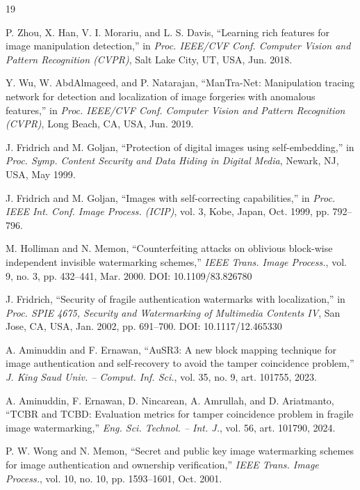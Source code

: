\documentclass[conference]{IEEEtran}
\begin{document}
\begin{thebibliography}{19}

 P. Zhou, X. Han, V. I. Morariu, and L. S. Davis, ``Learning rich features for image manipulation detection,'' in \emph{Proc. IEEE/CVF Conf. Computer Vision and Pattern Recognition (CVPR)}, Salt Lake City, UT, USA, Jun. 2018.

 Y. Wu, W. AbdAlmageed, and P. Natarajan, ``ManTra-Net: Manipulation tracing network for detection and localization of image forgeries with anomalous features,'' in \emph{Proc. IEEE/CVF Conf. Computer Vision and Pattern Recognition (CVPR)}, Long Beach, CA, USA, Jun. 2019.

 J. Fridrich and M. Goljan, ``Protection of digital images using self-embedding,'' in \emph{Proc. Symp. Content Security and Data Hiding in Digital Media}, Newark, NJ, USA, May 1999.

 J. Fridrich and M. Goljan, ``Images with self-correcting capabilities,'' in \emph{Proc. IEEE Int. Conf. Image Process. (ICIP)}, vol. 3, Kobe, Japan, Oct. 1999, pp. 792--796.

 M. Holliman and N. Memon, ``Counterfeiting attacks on oblivious block-wise independent invisible watermarking schemes,'' \emph{IEEE Trans. Image Process.}, vol. 9, no. 3, pp. 432--441, Mar. 2000. DOI: 10.1109/83.826780

 J. Fridrich, ``Security of fragile authentication watermarks with localization,'' in \emph{Proc. SPIE 4675, Security and Watermarking of Multimedia Contents IV}, San Jose, CA, USA, Jan. 2002, pp. 691--700. DOI: 10.1117/12.465330

 A. Aminuddin and F. Ernawan, ``AuSR3: A new block mapping technique for image authentication and self-recovery to avoid the tamper coincidence problem,'' \emph{J. King Saud Univ. -- Comput. Inf. Sci.}, vol. 35, no. 9, art. 101755, 2023.

 A. Aminuddin, F. Ernawan, D. Nincarean, A. Amrullah, and D. Ariatmanto, ``TCBR and TCBD: Evaluation metrics for tamper coincidence problem in fragile image watermarking,'' \emph{Eng. Sci. Technol. -- Int. J.}, vol. 56, art. 101790, 2024.

 P. W. Wong and N. Memon, ``Secret and public key image watermarking schemes for image authentication and ownership verification,'' \emph{IEEE Trans. Image Process.}, vol. 10, no. 10, pp. 1593--1601, Oct. 2001.


\end{thebibliography}
\end{document}
